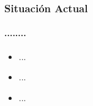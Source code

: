 \begin{frame}
\frametitle{Situación Actual}
\framesubtitle{........}

\begin{itemize}
	\item<1-> ...
	\item<2-> ...
	\item<3-> ...
\end{itemize}
\end{frame}
